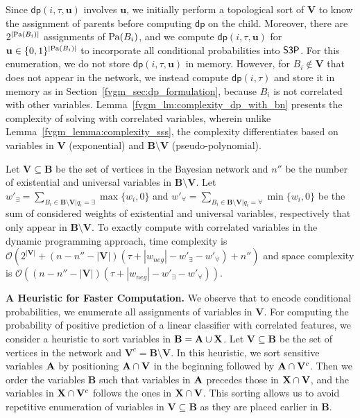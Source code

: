Since $ \mathsf{dp}(i, \tau, \mathbf{u}) $ involves  $ \mathbf{u} $, we initially perform a topological sort of $ \mathbf{V} $ to know the assignment of parents before computing $ \mathsf{dp} $ on the child. Moreover, there are $ 2^{|\mathrm{Pa}(B_i)|} $ assignments of $ \mathrm{Pa}(B_i) $, and we compute $ \mathsf{dp}(i, \tau, \mathbf{u}) $ for $ \mathbf{u} \in \{0,1\}^{|\mathrm{Pa}(B_i)|} $ to incorporate all conditional probabilities into $ \mathsf{S3P} $.  For this enumeration, we do not store $ \mathsf{dp}(i, \tau, \mathbf{u}) $ in memory. However, for $ B_i \not \in \mathbf{V} $ that does not appear in the network, we instead compute $ \mathsf{dp}(i, \tau) $ and store it in memory as in Section~\ref{fvgm_sec:dp_formulation}, because $ B_i $ is not correlated with other variables.  Lemma~\ref{fvgm_lm:complexity_dp_with_bn} presents the complexity of solving {\stochastic} with correlated variables, wherein unlike Lemma~\ref{fvgm_lemma:complexity_sss}, the  complexity differentiates based on variables in $ \mathbf{V} $ (exponential) and $ \mathbf{B}\setminus \mathbf{V} $ (pseudo-polynomial). 


\begin{lemma}
	\label{fvgm_lm:complexity_dp_with_bn}
	Let $ \mathbf{V} \subseteq \mathbf{B} $ be the set of vertices in the Bayesian network and $ n'' $ be the number of existential and universal variables in $ \mathbf{B} \setminus \mathbf{V} $. Let $ w'_{\exists} = \sum_{B_i \in \mathbf{B} \setminus \mathbf{V} | q_i = \exists} \max\{w_i, 0\}$  and $ w'_{\forall} = \sum_{B_i \in \mathbf{B} \setminus \mathbf{V} | q_i = \forall} \min\{w_i, 0\}$ be the sum of considered weights of existential and universal variables, respectively that only appear in $ \mathbf{B} \setminus \mathbf{V} $. To exactly compute {\stochastic} with correlated variables in the dynamic programming approach,  time complexity is $ \mathcal{O}(2^{|\mathbf{V}|} + (n - n'' - |\mathbf{V}|)(\tau + |w_{neg}| - w'_{\exists} - w'_{\forall}) + n'') $ and space complexity is $ \mathcal{O}((n - n'' - |\mathbf{V}|)(\tau + |w_{neg}| - w'_{\exists} - w'_{\forall})) $.
\end{lemma}	

\textbf{A Heuristic for Faster Computation.} We observe that to encode conditional probabilities, we enumerate all assignments of variables in $ \mathbf{V} $. For computing the probability of positive prediction of a linear classifier with correlated features, we consider a heuristic to sort variables in $ \mathbf{B} = \mathbf{A} \cup \mathbf{X} $. Let $ \mathbf{V} \subseteq \mathbf{B} $ be the set of vertices in the network and $ \mathbf{V}^c = \mathbf{B} \setminus \mathbf{V} $. In this heuristic, we sort sensitive variables $ \mathbf{A} $ by positioning $ \mathbf{A} \cap \mathbf{V} $ in the beginning followed by $ \mathbf{A} \cap \mathbf{V}^c $. Then we order the variables $ \mathbf{B} $ such that variables in $ \mathbf{A} $ precedes those in $ \mathbf{X} \cap \mathbf{V} $, and the variables in $ \mathbf{X} \cap \mathbf{V}^c $ follows the ones in $ \mathbf{X} \cap \mathbf{V} $. This sorting allows us to avoid repetitive enumeration of variables in $ \mathbf{V} \subseteq \mathbf{B} $ as they are placed earlier in $ \mathbf{B} $.

